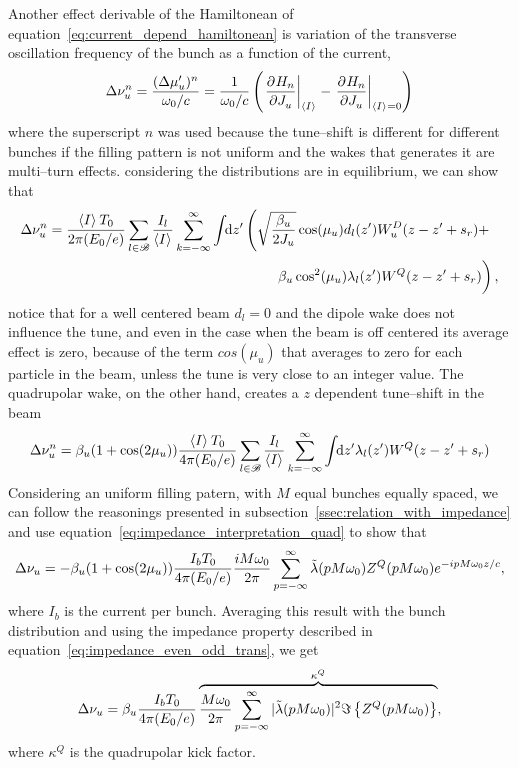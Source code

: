     Another effect derivable of the Hamiltonean of equation~\eqref{eq:current_depend_hamiltonean} is variation of the transverse oscillation frequency of the bunch as a function of the current,
    \begin{align}
        \Delta\nu_u^n = \frac{(\Delta\mu'_u)^n}{\omega_0/c} = \frac{1}{\omega_0/c}\left(\left.\frac{\partial^{{}}H_n}{\partial J_u^{{}}}\right|_{\left\langle I \right\rangle_{{}}} - \left.\frac{\partial^{{}}H_n}{\partial J_u^{{}}}\right|_{\left\langle I \right\rangle_{{}}=0}\right)
    \end{align}
    where the superscript $n$ was used because the tune--shift is different for different bunches if the filling pattern is not uniform and the wakes that generates it are multi--turn effects. considering the distributions are in equilibrium, we can show that
    \begin{align}
        \Delta\nu_u^n = \frac{\average{I}T_0}{2\pi(E_0/e)}
        \sum_{l\in\mathscr{B}}\frac{I_l}{\average{I}}\sum_{k=-\infty}^\infty\udefint{z'}{
        &\left(\sqrt{\frac{\beta_u}{2J_u}}\cos(\mu_u)d_l(z') W^D_u(z-z' + s_r) +\right.\\
        &\left.\phantom{\sqrt{\frac{1_1}{1_1}}}\beta_u\cos^2(\mu_u)\lambda_l(z') W^Q(z-z' + s_r)\right)},
    \end{align}
    notice that for a well centered beam $d_l=0$ and the dipole wake does not influence the tune, and even in the case when the beam is off centered its average effect is zero, because of the term $cos(\mu_u)$ that averages to zero for each particle in the beam, unless the tune is very close to an integer value. The quadrupolar wake, on the other hand, creates a $z$ dependent tune--shift in the beam
    \begin{align}
        \Delta\nu_u^n = \beta_u(1+\cos(2\mu_u))\frac{\left\langle I \right\rangle_{{}}T_0}{4\pi(E_0/e)}
        \sum_{l\in\mathscr{B}}\frac{I_l}{\left\langle I \right\rangle_{{}}}\sum_{k=-\infty}^\infty\int\!\!\text{d}z' 
        \lambda_l(z') W^Q(z-z' + s_r)
    \end{align}
    Considering an uniform filling patern, with $M$ equal bunches equally spaced, we can follow the reasonings presented in subsection~\ref{ssec:relation_with_impedance} and use equation~\eqref{eq:impedance_interpretation_quad} to show that
    \begin{align}
        \Delta\nu_u = -\beta_u(1+\cos(2\mu_u))\frac{I_bT_0}{4\pi(E_0/e)}
        \frac{iM\omega_0}{2\pi} \sum_{p=-\infty}^\infty \tilde{\lambda}(pM\omega_0)Z^Q(pM\omega_0)e^{-ipM\omega_0 z/c},
    \end{align}
    where $I_b$ is the current per bunch. Averaging this result with the bunch distribution and using the impedance property described in equation~\eqref{eq:impedance_even_odd_trans}, we get
    \begin{align}
        \Delta\nu_u = \beta_u\frac{I_bT_0}{4\pi(E_0/e)}
        \overbrace{
        \frac{M\omega_0}{2\pi} \sum_{p=-\infty}^\infty |\tilde{\lambda}(pM\omega_0)|^2\Im\left\{Z^Q(pM\omega_0)\right\}}^{\kappa^Q},
    \end{align}
    where $\kappa^Q$ is the quadrupolar kick factor.


